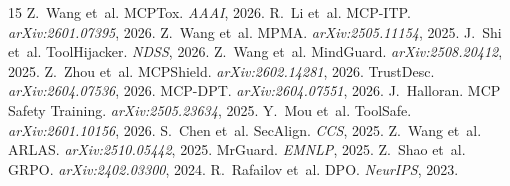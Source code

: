 \documentclass[11pt,a4paper]{article}
\begin{document}

\begin{thebibliography}{15}
 Z.~Wang et~al. MCPTox. \emph{AAAI}, 2026.
 R.~Li et~al. MCP-ITP. \emph{arXiv:2601.07395}, 2026.
 Z.~Wang et~al. MPMA. \emph{arXiv:2505.11154}, 2025.
 J.~Shi et~al. ToolHijacker. \emph{NDSS}, 2026.
 Z.~Wang et~al. MindGuard. \emph{arXiv:2508.20412}, 2025.
 Z.~Zhou et~al. MCPShield. \emph{arXiv:2602.14281}, 2026.
 TrustDesc. \emph{arXiv:2604.07536}, 2026.
 MCP-DPT. \emph{arXiv:2604.07551}, 2026.
 J.~Halloran. MCP Safety Training. \emph{arXiv:2505.23634}, 2025.
 Y.~Mou et~al. ToolSafe. \emph{arXiv:2601.10156}, 2026.
 S.~Chen et~al. SecAlign. \emph{CCS}, 2025.
 Z.~Wang et~al. ARLAS. \emph{arXiv:2510.05442}, 2025.
 MrGuard. \emph{EMNLP}, 2025.
 Z.~Shao et~al. GRPO. \emph{arXiv:2402.03300}, 2024.
 R.~Rafailov et~al. DPO. \emph{NeurIPS}, 2023.
\end{thebibliography}
\end{document}
